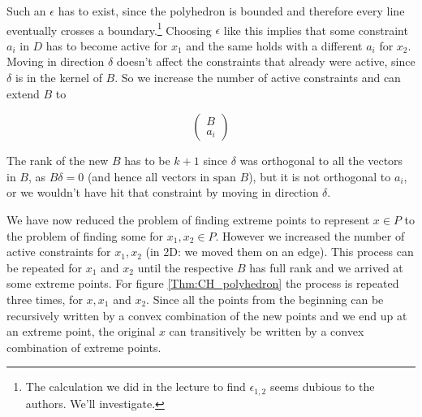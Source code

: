 \begin{pr}
\begin{description}
Such an $\epsilon$ has to exist, since the polyhedron is bounded and therefore every line eventually crosses a boundary.\footnote{The calculation we did in the lecture to find $\epsilon_{1,2}$ seems dubious to the authors. We'll investigate.} Choosing $\epsilon$ like this implies that some constraint $a_i$ in $D$ has to become active for $x_1$ and the same holds with a different $a_i$ for $x_2$. Moving in direction $\delta$ doesn't affect the constraints that already were active, since $\delta$ is in the kernel of $B$. So we increase the number of active constraints and can extend $B$ to 

\[\begin{pmatrix}B\\ a_i\end{pmatrix}\] 

The rank of the new $B$ has to be $k+1$ since $\delta$ was orthogonal to all the vectors in $B$, as $B\delta=0$ (and hence all vectors in $\text{span } B$), but it is not orthogonal to $a_i$, or we wouldn't have hit that constraint by moving in direction $\delta$.

We have now reduced the problem of finding extreme points to represent $x \in P$ to the problem of finding some for $x_1,x_2 \in P$. However we increased the number of active constraints for $x_1,x_2$ (in 2D: we moved them on an edge). This process can be repeated for $x_1$ and $x_2$ until the respective $B$ has full rank and we arrived at some extreme points. For figure \ref{Thm:CH_polyhedron} the process is repeated three times, for $x,x_1$ and $x_2$. 
Since all the points from the beginning can be recursively written by a convex combination of the new points and we end up at an extreme point, the original $x$ can transitively be written by a convex combination of extreme points.
\end{description}

%




\end{pr}

